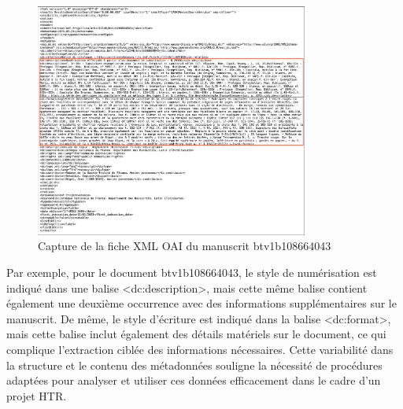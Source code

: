 \documentclass[a4paper,12pt,twoside]{book}
\begin{document}
		\begin{figure}[h!]
		\centering
		\includegraphics[width=0.8\textwidth]{images/fiche_xml_dc.png}
		\caption{Capture de la fiche XML OAI du manuscrit btv1b108664043}
		\label{fig:monimage}
		\end{figure}
	
	
	Par exemple, pour le document btv1b108664043, le style de numérisation est indiqué dans une balise <dc:description>, mais cette même balise contient également une deuxième occurrence avec des informations supplémentaires sur le manuscrit. De même, le style d’écriture est indiqué dans la balise <dc:format>, mais cette balise inclut également des détails matériels sur le document, ce qui complique l’extraction ciblée des informations nécessaires. Cette variabilité dans la structure et le contenu des métadonnées souligne la nécessité de procédures adaptées pour analyser et utiliser ces données efficacement dans le cadre d’un projet HTR.
	
\end{document}
